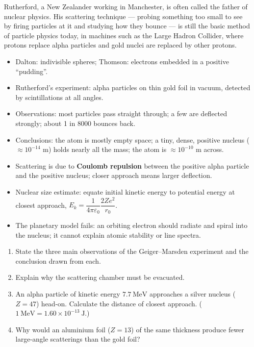 \documentclass[11pt]{article}
\newcommand{\cle}[1]{{\popxbold\color{popdark}#1}}
\begin{document}
\begin{savaistu}
Rutherford, a New Zealander working in Manchester, is often called the father of nuclear physics. His scattering technique — probing something too small to see by firing particles at it and studying how they bounce — is still the basic method of particle physics today, in machines such as the Large Hadron Collider, where protons replace alpha particles and gold nuclei are replaced by other protons.
\end{savaistu}

\begin{aretenir}
\begin{itemize}
\item Dalton: indivisible spheres; Thomson: electrons embedded in a positive ``pudding''.
\item Rutherford's experiment: alpha particles on thin gold foil in vacuum, detected by scintillations at all angles.
\item Observations: most particles pass straight through; a few are deflected strongly; about 1 in 8000 bounces back.
\item Conclusions: the atom is mostly empty space; a tiny, dense, positive \cle{nucleus} ($\approx10^{-14}$ m) holds nearly all the mass; the atom is $\approx10^{-10}$ m across.
\item Scattering is due to \textbf{Coulomb repulsion} between the positive alpha particle and the positive nucleus; closer approach means larger deflection.
\item Nuclear size estimate: equate initial kinetic energy to potential energy at closest approach, $E_k=\dfrac{1}{4\pi\varepsilon_{0}}\dfrac{2Ze^{2}}{r_0}$.
\item The planetary model fails: an orbiting electron should radiate and spiral into the nucleus; it cannot explain atomic stability or line spectra.
\end{itemize}
\end{aretenir}

\begin{exercice}
\begin{enumerate}
\item State the three main observations of the Geiger--Marsden experiment and the conclusion drawn from each.
\item Explain why the scattering chamber must be evacuated.
\item An alpha particle of kinetic energy $7.7\ \mathrm{MeV}$ approaches a silver nucleus ($Z = 47$) head-on. Calculate the distance of closest approach. ($1\ \mathrm{MeV}=1.60\times10^{-13}\ \mathrm{J}$.)
\item Why would an aluminium foil ($Z = 13$) of the same thickness produce fewer large-angle scatterings than the gold foil?
\end{enumerate}
\end{exercice}
\end{document}
